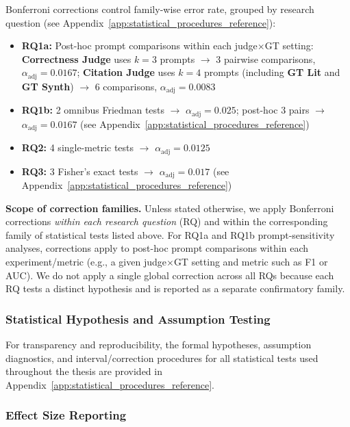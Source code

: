Bonferroni corrections control family-wise error rate, grouped by research question (see Appendix~\ref{app:statistical_procedures_reference}):
\begin{itemize}[noitemsep]
    \item \textbf{RQ1a:} Post-hoc prompt comparisons within each judge$\times$GT setting: \textbf{Correctness Judge} uses $k=3$ prompts $\rightarrow$ 3 pairwise comparisons, $\alpha_{\text{adj}} = 0.0167$; \textbf{Citation Judge} uses $k=4$ prompts (including \textbf{GT Lit} and \textbf{GT Synth}) $\rightarrow$ 6 comparisons, $\alpha_{\text{adj}} = 0.0083$
    \item \textbf{RQ1b:} 2 omnibus Friedman tests $\rightarrow$ $\alpha_{\text{adj}} = 0.025$; post-hoc 3 pairs $\rightarrow$ $\alpha_{\text{adj}} = 0.0167$ (see Appendix~\ref{app:statistical_procedures_reference})
    \item \textbf{RQ2:} 4 single-metric tests $\rightarrow$ $\alpha_{\text{adj}} = 0.0125$
    \item \textbf{RQ3:} 3 Fisher's exact tests $\rightarrow$ $\alpha_{\text{adj}} = 0.017$ (see Appendix~\ref{app:statistical_procedures_reference})
\end{itemize}

\textbf{Scope of correction families.} Unless stated otherwise, we apply Bonferroni corrections \emph{within each research question} (RQ) and within the corresponding family of statistical tests listed above. For RQ1a and RQ1b prompt-sensitivity analyses, corrections apply to post-hoc prompt comparisons within each experiment/metric (e.g., a given judge$\times$GT setting and metric such as F1 or AUC). We do not apply a single global correction across all RQs because each RQ tests a distinct hypothesis and is reported as a separate confirmatory family.

\subsubsection{Statistical Hypothesis and Assumption Testing}
\label{sec:test_interpretation}

For transparency and reproducibility, the formal hypotheses, assumption diagnostics, and interval/correction procedures for all statistical tests used throughout the thesis are provided in Appendix~\ref{app:statistical_procedures_reference}.

\subsubsection{Effect Size Reporting}
\label{sec:effect_sizes}

